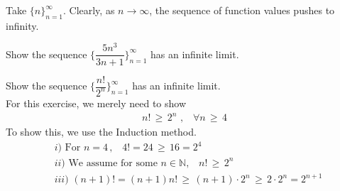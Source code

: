 \begin{example}
Take $\{n\}_{n=1}^{\infty}$. Clearly, as $n \longrightarrow \infty$, the sequence of function values pushes to infinity.
\end{example}

\begin{exercise}
Show the sequence $\Big\{\dfrac{5n^{3}}{3n+1}\Big\}_{n=1}^{\infty}$ has an infinite limit. 
\end{exercise}

\begin{exercise}\label{exercise_4_ch_2}
Show the sequence $\Big\{\dfrac{n!}{2^{n}}\Big\}_{n=1}^{\infty}$ has an infinite limit.\\[1ex]
For this exercise, we merely need to show 
\begin{align*}
    n! \hspace{2pt} \geq \hspace{2pt} 2^{n} \hspace{4pt}, \hspace{10pt} \forall n \hspace{2pt} \geq \hspace{2pt} 4
\end{align*}
To show this, we use the Induction method. 
\begin{align*}
    &i) \hspace{4pt} \text{For} \hspace{4pt} n = 4 \hspace{2pt}, \hspace{10pt} 4! = 24 \hspace{2pt} \geq \hspace{2pt} 16 = 2^{4}\\[2ex]
    &ii) \hspace{4pt} \text{We assume for some} \hspace{4pt} n \in \mathbb{N}, \hspace{10pt} n! \hspace{2pt} \geq \hspace{2pt} 2^{n}\\[2ex]
    &iii) \hspace{4pt} (n+1)! = (n+1)n! \hspace{2pt} \geq \hspace{2pt} (n+1) \cdot 2^{n} \hspace{2pt} \geq \hspace{2pt} 2 \cdot 2^{n} = 2^{n+1}
\end{align*}
\end{exercise}

